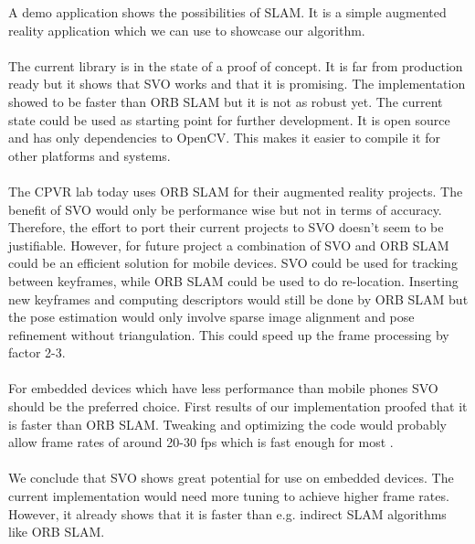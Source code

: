 \documentclass[11pt,a4paper,titlepage,oneside]{report}
\begin{document}
A demo application shows the possibilities of SLAM. It is a simple augmented reality application which we can use to showcase our algorithm.\\\\
The current library is in the state of a proof of concept. It is far from production ready but it shows that SVO works and that it is promising. The implementation showed to be faster than ORB SLAM but it is not as robust yet. The current state could be used as starting point for further development. It is open source and has only dependencies to OpenCV. This makes it easier to compile it for other platforms and systems.\\\\
The CPVR lab today uses ORB SLAM for their augmented reality projects. The benefit of SVO would only be performance wise but not in terms of accuracy. Therefore, the effort to port their current projects to SVO doesn't seem to be justifiable. However, for future project a combination of SVO and ORB SLAM could be an efficient solution for mobile devices. SVO could be used for tracking between keyframes, while ORB SLAM could be used to do re-location. Inserting new keyframes and computing descriptors would still be done by ORB SLAM but the pose estimation would only involve sparse image alignment and pose refinement without triangulation. This could speed up the frame processing by factor 2-3.\\\\
For embedded devices which have less performance than mobile phones SVO should be the preferred choice. First results of our implementation proofed that it is faster than ORB SLAM. Tweaking and optimizing the code would probably allow frame rates of around 20-30 fps which is fast enough for most .\\\\
We conclude that SVO shows great potential for use on embedded devices. The current implementation would need more tuning to achieve higher frame rates. However, it already shows that it is faster than e.g. indirect SLAM algorithms like ORB SLAM.

\printbibliography
\end{document}
